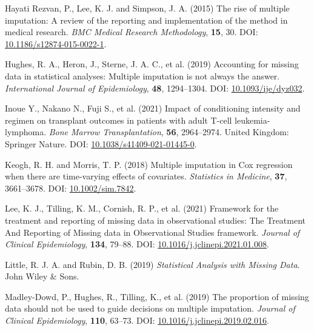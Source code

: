 \documentclass[
  letterpaper,
  DIV=11,
  numbers=noendperiod]{scrreprt}
\newlength{\cslhangindent}
\newlength{\cslentryspacingunit} %
\newenvironment{CSLReferences}[2] %
 {%
  \setlength{\parindent}{0pt}
  \ifodd #1
  \let\oldpar\par
  \def\par{\hangindent=\cslhangindent\oldpar}
  \fi
  \setlength{\parskip}{#2\cslentryspacingunit}
 }%
 {}
\begin{document}
\begin{CSLReferences}{1}{0}
\leavevmode{}%
Hayati Rezvan, P., Lee, K. J. and Simpson, J. A. (2015) The rise of
multiple imputation: A review of the reporting and implementation of the
method in medical research. \emph{BMC Medical Research Methodology},
\textbf{15}, 30. DOI:
\href{https://doi.org/10.1186/s12874-015-0022-1}{10.1186/s12874-015-0022-1}.

\leavevmode{}%
Hughes, R. A., Heron, J., Sterne, J. A. C., et al. (2019) Accounting for
missing data in statistical analyses: Multiple imputation is not always
the answer. \emph{International Journal of Epidemiology}, \textbf{48},
1294--1304. DOI:
\href{https://doi.org/10.1093/ije/dyz032}{10.1093/ije/dyz032}.

\leavevmode{}%
Inoue Y., Nakano N., Fuji S., et al. (2021) Impact of conditioning
intensity and regimen on transplant outcomes in patients with adult
{T-cell} leukemia-lymphoma. \emph{Bone Marrow Transplantation},
\textbf{56}, 2964--2974. United Kingdom: Springer Nature. DOI:
\href{https://doi.org/10.1038/s41409-021-01445-0}{10.1038/s41409-021-01445-0}.

\leavevmode{}%
Keogh, R. H. and Morris, T. P. (2018) Multiple imputation in {Cox}
regression when there are time-varying effects of covariates.
\emph{Statistics in Medicine}, \textbf{37}, 3661--3678. DOI:
\href{https://doi.org/10.1002/sim.7842}{10.1002/sim.7842}.

\leavevmode{}%
Lee, K. J., Tilling, K. M., Cornish, R. P., et al. (2021) Framework for
the treatment and reporting of missing data in observational studies:
{The Treatment And Reporting} of {Missing} data in {Observational
Studies} framework. \emph{Journal of Clinical Epidemiology},
\textbf{134}, 79--88. DOI:
\href{https://doi.org/10.1016/j.jclinepi.2021.01.008}{10.1016/j.jclinepi.2021.01.008}.

\leavevmode{}%
Little, R. J. A. and Rubin, D. B. (2019) \emph{Statistical {Analysis}
with {Missing Data}}. John Wiley \& Sons.

\leavevmode{}%
Madley-Dowd, P., Hughes, R., Tilling, K., et al. (2019) The proportion
of missing data should not be used to guide decisions on multiple
imputation. \emph{Journal of Clinical Epidemiology}, \textbf{110},
63--73. DOI:
\href{https://doi.org/10.1016/j.jclinepi.2019.02.016}{10.1016/j.jclinepi.2019.02.016}.


\end{CSLReferences}
\end{document}

